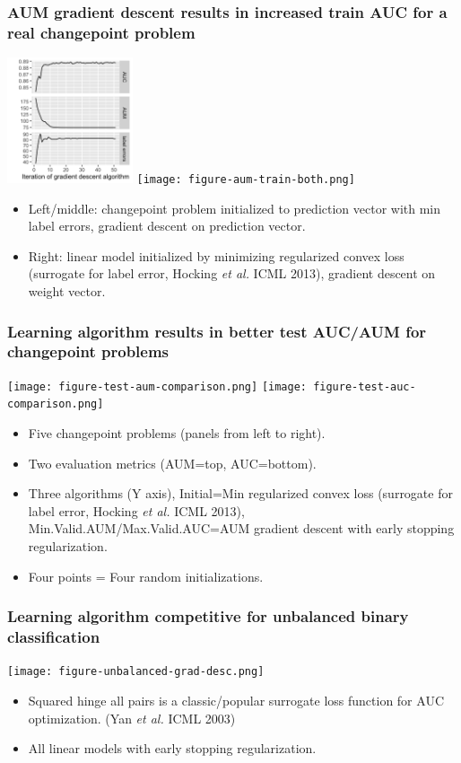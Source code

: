 \documentclass[t]{beamer}
\begin{document}
\begin{frame}
  \frametitle{AUM gradient descent results in increased train AUC for
    a real changepoint problem}

\includegraphics[height=3.7cm]{figure-aum-optimized-iterations.png}
\texttt{[image: figure-aum-train-both.png]}

\begin{itemize}
\item Left/middle: changepoint problem initialized to prediction vector with
  min label errors, gradient descent on prediction vector.
\item Right: linear model initialized by minimizing regularized convex
  loss (surrogate for label error, Hocking \emph{et al.} ICML 2013),
  gradient descent on weight vector.
\end{itemize}

\end{frame}

\begin{frame}
  \frametitle{Learning algorithm results in better test AUC/AUM for changepoint problems}
    
\texttt{[image: figure-test-aum-comparison.png]}
\texttt{[image: figure-test-auc-comparison.png]}

\begin{itemize}
\item Five changepoint problems (panels from left to right).
\item Two evaluation metrics (AUM=top, AUC=bottom).
\item Three algorithms (Y axis), Initial=Min regularized convex loss
  (surrogate for label error, Hocking \emph{et al.} ICML 2013), Min.Valid.AUM/Max.Valid.AUC=AUM
  gradient descent with early stopping regularization.
\item Four points = Four random initializations.
\end{itemize}

\end{frame}

\begin{frame}
  \frametitle{Learning algorithm competitive for unbalanced binary classification}

 \texttt{[image: figure-unbalanced-grad-desc.png]}

 \begin{itemize}
 \item Squared hinge all pairs is a classic/popular surrogate loss function
   for AUC optimization. (Yan \emph{et al.} ICML 2003)
 \item All linear models with early stopping regularization.
 \end{itemize}

\end{frame}
\end{document}
